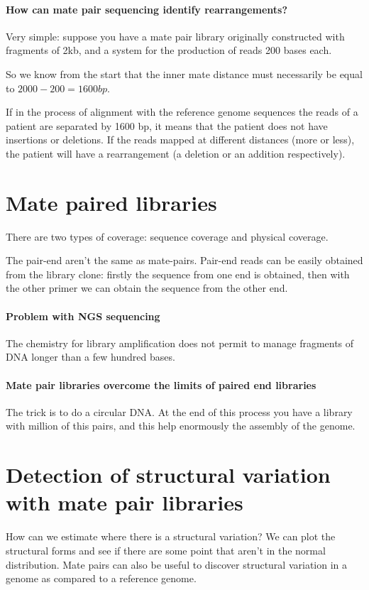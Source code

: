 \paragraph*{How can mate pair sequencing identify rearrangements?}

Very simple: suppose you have a mate pair library originally constructed
with fragments of 2kb, and a system for the production of reads 200 bases each.

So we know from the start that the inner mate distance must necessarily be
equal to $2000 - 200 = 1600 bp$.

If in the process of alignment with the reference genome sequences the reads
of a patient are separated by 1600 bp, it means that the patient does not have
insertions or deletions.
If the reads mapped at different distances (more or less), the patient will
have a rearrangement (a deletion or an addition respectively).

\section{Mate paired libraries}

There are two types of coverage: sequence coverage and physical coverage.

The pair-end aren't the same as mate-pairs.
Pair-end reads can be easily obtained from the library clone: firstly the 
sequence from one end is obtained, then with the other primer we can obtain the 
sequence from the other end.

\paragraph*{Problem with NGS sequencing} The chemistry for library 
amplification does not permit to manage fragments of DNA longer than a few 
hundred bases.
\paragraph*{Mate pair libraries overcome the limits of paired end libraries}
The trick is to do a circular DNA. At the end of this process you have a
library with million of this pairs, and this help enormously the assembly of
the genome.

\section{Detection of structural variation with mate pair libraries}

How can we estimate where there is a structural variation? We can plot the 
structural forms and see if there are some point that aren't in the normal 
distribution. Mate pairs can also be useful to discover structural variation in 
a genome as compared to a reference genome.

